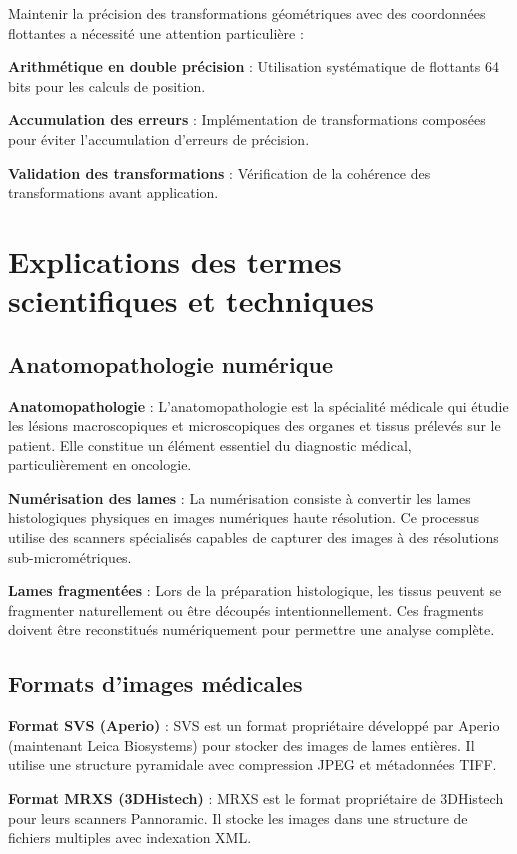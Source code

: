 \documentclass[12pt,a4paper]{report}
\begin{document}
\begin{}
\begin{}
\begin{}
\begin{}
Maintenir la précision des transformations géométriques avec des coordonnées flottantes a nécessité une attention particulière :

\textbf{Arithmétique en double précision} : Utilisation systématique de flottants 64 bits pour les calculs de position.

\textbf{Accumulation des erreurs} : Implémentation de transformations composées pour éviter l'accumulation d'erreurs de précision.

\textbf{Validation des transformations} : Vérification de la cohérence des transformations avant application.

\section{Explications des termes scientifiques et techniques}

\subsection{Anatomopathologie numérique}

\textbf{Anatomopathologie} : L'anatomopathologie est la spécialité médicale qui étudie les lésions macroscopiques et microscopiques des organes et tissus prélevés sur le patient. Elle constitue un élément essentiel du diagnostic médical, particulièrement en oncologie.

\textbf{Numérisation des lames} : La numérisation consiste à convertir les lames histologiques physiques en images numériques haute résolution. Ce processus utilise des scanners spécialisés capables de capturer des images à des résolutions sub-micrométriques.

\textbf{Lames fragmentées} : Lors de la préparation histologique, les tissus peuvent se fragmenter naturellement ou être découpés intentionnellement. Ces fragments doivent être reconstitués numériquement pour permettre une analyse complète.

\subsection{Formats d'images médicales}

\textbf{Format SVS (Aperio)} : SVS est un format propriétaire développé par Aperio (maintenant Leica Biosystems) pour stocker des images de lames entières. Il utilise une structure pyramidale avec compression JPEG et métadonnées TIFF.

\textbf{Format MRXS (3DHistech)} : MRXS est le format propriétaire de 3DHistech pour leurs scanners Pannoramic. Il stocke les images dans une structure de fichiers multiples avec indexation XML.


\end{}
\end{}
\end{}
\end{}
\end{document}
